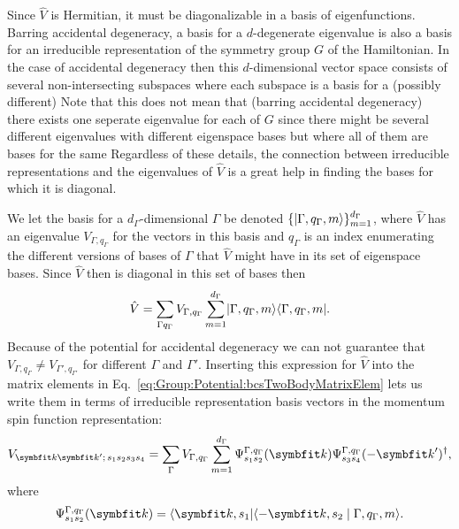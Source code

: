 Since $\hat{V}$ is Hermitian, it must be diagonalizable in a basis of eigenfunctions. Barring accidental degeneracy, a basis for a $d$-degenerate
eigenvalue is also a basis for an irreducible representation of the symmetry group $G$ of the Hamiltonian. In the case of accidental degeneracy
then this $d$-dimensional vector space consists of several non-intersecting subspaces where each subspace is a basis for a (possibly different) \irr Note
that this does not mean that (barring accidental degeneracy) there exists one seperate eigenvalue for each \irr of $G$ since there might be
several different eigenvalues with different eigenspace bases but where all of them are bases for the same \irr Regardless of these details,
the connection between irreducible representations and the eigenvalues of $\hat{V}$ is a great help in finding the bases for which it is
diagonal.

We let the basis for a $d_\Gamma$-dimensional \irr $\Gamma$ be denoted $\{\lvert \Gamma,q_\Gamma,m \rangle\}_{m=1}^{d_\Gamma}$, where $\hat{V}$ has an eigenvalue $V_{\Gamma,q_\Gamma}$
for the vectors in this basis and $q_\Gamma$ is an index enumerating the different versions of bases of $\Gamma$ that $\hat{V}$ might have
in its set of eigenspace bases. Since $\hat{V}$ then is diagonal in this set of bases then
\begin{equation}
    \label{eq:Group:Potential:potIrrepDecomp}
    \hat{V} = \sum_{\Gamma q_\Gamma}V_{\Gamma,q_\Gamma}\sum_{m=1}^{d_\Gamma}\lvert \Gamma,q_\Gamma,m \rangle\langle \Gamma,q_\Gamma,m \rvert.
\end{equation}
Because of the potential for accidental degeneracy we can not guarantee that $V_{\Gamma,q_\Gamma}\neq V_{\Gamma',q_{\Gamma'}}$ for different $\Gamma$ and $\Gamma'$.
Inserting this expression for $\hat{V}$ into the matrix elements in Eq.~\eqref{eq:Group:Potential:bcsTwoBodyMatrixElem} lets us write them in terms of
irreducible representation basis vectors in the momentum spin function representation:
\begin{equation}
    \label{eq:Group:Potential:irrepPotMatrixElem}
    V_{\v{k}\v{k}';\,s_1s_2s_3s_4} = \sum_\Gamma V_{\Gamma,q_\Gamma}\sum_{m=1}^{d_\Gamma}\Psi_{s_1s_2}^{\Gamma,q_\Gamma}(\v{k})\Psi_{s_3s_4}^{\Gamma,q_\Gamma}(-\v{k}')^\dagger,
\end{equation}
where
\begin{equation}
    \label{eq:Group:Potential:irrepPotMatrixElem:coeff}
    \Psi_{s_1s_2}^{\Gamma,q_\Gamma}(\v{k}) = \bra{\v{k},s_1}\braket{-\v{k},s_2}{\Gamma,q_\Gamma,m}.
\end{equation}

